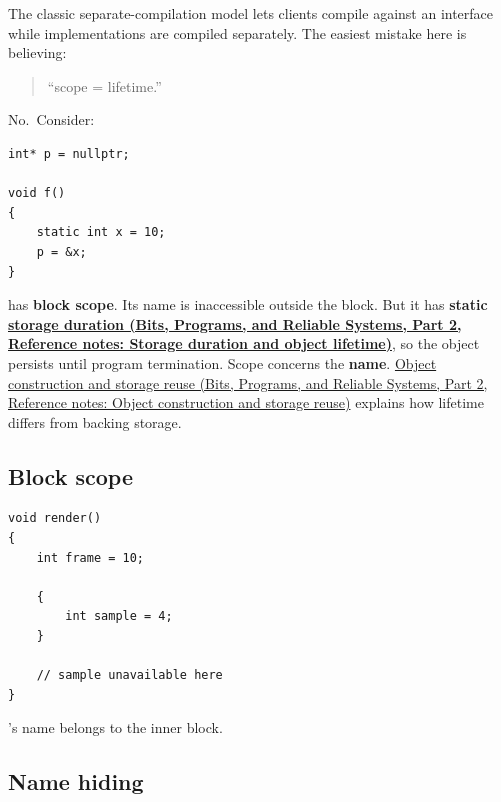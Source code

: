 The classic separate-compilation model lets clients compile against an interface while implementations are compiled separately. The easiest mistake here is believing:

\begin{quote}
``scope = lifetime.''
\end{quote}

No.~Consider:

\begin{verbatim}
int* p = nullptr;

void f()
{
    static int x = 10;
    p = &x;
}
\end{verbatim}

 has \textbf{block scope}. Its name  is inaccessible outside the block. But it has \textbf{static \href{../01-Bits-Programs-and-Reliable-Systems-P02/main.pdf\#nameddest=appendix-0b104bcba06b}{storage duration (Bits, Programs, and Reliable Systems, Part 2, Reference notes: Storage duration and object lifetime)}}, so the object persists until program termination. Scope concerns the \textbf{name}. \href{../01-Bits-Programs-and-Reliable-Systems-P02/main.pdf\#nameddest=appendix-a82f9c438857}{Object construction and storage reuse (Bits, Programs, and Reliable Systems, Part 2, Reference notes: Object construction and storage reuse)} explains how lifetime differs from backing storage.

\subsection{Block scope}\label{05-engine-i-ch002-block-scope}

\hypertarget{05-engine-i-ch002-block-scope}{}

\begin{verbatim}
void render()
{
    int frame = 10;

    {
        int sample = 4;
    }

    // sample unavailable here
}
\end{verbatim}

's name belongs to the inner block.

\subsection{Name hiding}\label{05-engine-i-ch002-name-hiding}

\hypertarget{05-engine-i-ch002-name-hiding}{}

